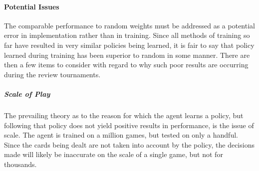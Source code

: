 
\paragraph*{Potential Issues}
\label{sec:findings-r2-potentialissues}

The comparable performance to random weights must be addressed as a potential
error in implementation rather than in training.
%
Since all methods of training so far have resulted in very similar policies
being learned,
it is fair to say that policy learned during training has been superior to
random in some manner.
%
There are then a few items to consider with regard to why such poor results are occurring
during the review tournaments.




\subparagraph*{Scale of Play}

The prevailing theory as to the reason for which the agent learns a policy,
but following that policy does not yield positive results in performance,
is the issue of scale.
%
The agent is trained on a million games,
but tested on only a handful.
%
Since the cards being dealt are not taken into account by the policy,
the decisions made will likely be inaccurate on the scale of a single game,
but not for thousands.





